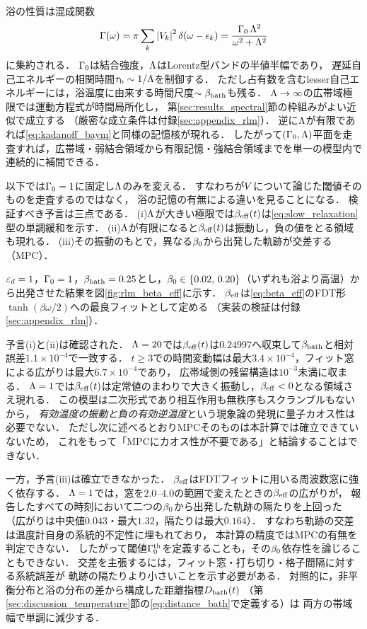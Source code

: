 \documentclass[a4paper,11pt,onecolumn,baselineskip=14.5pt]{jlreq}
\begin{document}
浴の性質は混成関数
\begin{equation}
  \Gamma(\omega) = \pi\sum_k \abs{V_k}^2\,\delta(\omega-\epsilon_k)
  = \frac{\Gamma_0\,\Lambda^2}{\omega^2+\Lambda^2}
  \label{eq:hybridization}
\end{equation}
に集約される．
$\Gamma_0$は結合強度，$\Lambda$はLorentz型バンドの半値半幅であり，
遅延自己エネルギーの相関時間$\tau_{\mathrm{b}}\sim1/\Lambda$を制御する．
ただし占有数を含むlesser自己エネルギーには，浴温度に由来する時間尺度$\sim\beta_{\mathrm{bath}}$も残る．
$\Lambda\to\infty$の広帯域極限では運動方程式が時間局所化し，
第\ref{sec:results_spectral}節の枠組みがよい近似で成立する
（厳密な成立条件は付録\ref{sec:appendix_rlm}）．
逆に$\Lambda$が有限であれば\eqref{eq:kadanoff_baym}と同様の記憶核が現れる．
したがって$(\Gamma_0,\Lambda)$平面を走査すれば，広帯域・弱結合領域から有限記憶・強結合領域までを単一の模型内で連続的に補間できる．

以下では$\Gamma_0=1$に固定し$\Lambda$のみを変える．
すなわち\cite{Wang2024}が$V$について論じた閾値そのものを走査するのではなく，
浴の記憶の有無による違いを見ることになる．
検証すべき予言は三点である．
(i)$\Lambda$が大きい極限では$\beta_{\mathrm{eff}}(t)$は\eqref{eq:slow_relaxation}型の単調緩和を示す．
(ii)$\Lambda$が有限になると$\beta_{\mathrm{eff}}(t)$は振動し，負の値をとる領域も現れる．
(iii)その振動のもとで，異なる$\beta_{0}$から出発した軌跡が交差する（MPC）．

$\varepsilon_{d}=1$，$\Gamma_0=1$，$\beta_{\mathrm{bath}}=0.25$とし，$\beta_{0}\in\{0.02,\,0.20\}$（いずれも浴より高温）から出発させた結果を図\ref{fig:rlm_beta_eff}に示す．
$\beta_{\mathrm{eff}}$は\eqref{eq:beta_eff}のFDT形$\tanh(\beta\omega/2)$への最良フィットとして定める
（実装の検証は付録\ref{sec:appendix_rlm}）．

予言(i)と(ii)は確認された．
$\Lambda=20$では$\beta_{\mathrm{eff}}(t)$は$0.24997$へ収束して$\beta_{\mathrm{bath}}$と相対誤差$1.1\times10^{-4}$で一致する．
$t\ge3$での時間変動幅は最大$3.4\times10^{-4}$，フィット窓による広がりは最大$6.7\times10^{-4}$であり，
広帯域側の残留構造は$10^{-3}$未満に収まる．
$\Lambda=1$では$\beta_{\mathrm{eff}}(t)$は定常値のまわりで大きく振動し，$\beta_{\mathrm{eff}}<0$となる領域さえ現れる．
この模型は二次形式であり相互作用も無秩序もスクランブルもないから，
\emph{有効温度の振動と負の有効逆温度}という現象論の発現に量子カオス性は必要でない．
ただし次に述べるとおりMPCそのものは本計算では確立できていないため，
これをもって「MPCにカオス性が不要である」と結論することはできない．

一方，予言(iii)は確立できなかった．
$\beta_{\mathrm{eff}}$はFDTフィットに用いる周波数窓に強く依存する．
$\Lambda=1$では，窓を$2.0$--$4.0$の範囲で変えたときの$\beta_{\mathrm{eff}}$の広がりが，
報告したすべての時刻において二つの$\beta_{0}$から出発した軌跡の隔たりを上回った
（広がりは中央値$0.043$・最大$1.32$，隔たりは最大$0.164$）．
すなわち軌跡の交差は温度計自身の系統的不定性に埋もれており，
本計算の精度ではMPCの有無を判定できない．
したがって閾値$\Gamma_0^{\mathrm{th}}$を定義することも，その$\beta_{0}$依存性を論じることもできない．
交差を主張するには，フィット窓・打ち切り・格子間隔に対する系統誤差が
軌跡の隔たりより小さいことを示す必要がある．
対照的に，非平衡分布と浴の分布の差から構成した距離指標$D_{\mathrm{bath}}(t)$
（第\ref{sec:discussion_temperature}節の\eqref{eq:distance_bath}で定義する）は
両方の帯域幅で単調に減少する．
\end{document}
